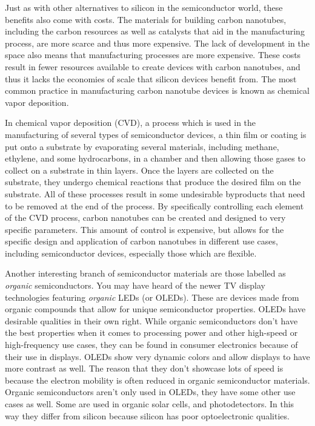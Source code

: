 \documentclass[12pt]{article}
\begin{document}
\begin{flushleft}
Just as with other alternatives to silicon in the semiconductor
world, these benefits also come with costs. The materials
for building carbon nanotubes, including the carbon
resources as well as catalysts that aid in the manufacturing
process, are more scarce and thus more expensive. The
lack of development in the space also means that manufacturing
processes are more expensive. These costs result in
fewer resources available to create devices with carbon
nanotubes, and thus it lacks the economies of scale
that silicon devices benefit from. The most common
practice in manufacturing carbon nanotube devices is
known as chemical vapor deposition.

In chemical vapor deposition (CVD), a process which
is used in the manufacturing of several types of semiconductor
devices, a thin film or coating is put onto a substrate
by evaporating several materials, including methane,
ethylene, and some hydrocarbons, in a chamber and then
allowing those gases to collect on a substrate in thin
layers. Once the layers are collected on the substrate,
they undergo chemical reactions that produce the desired
film on the substrate. All of these processes result
in some undesirable byproducts that need to be removed
at the end of the process. By specifically controlling
each element of the CVD process, carbon nanotubes can
be created and designed to very specific parameters.
This amount of control is expensive, but allows for the
specific design and application of carbon nanotubes in 
different use cases, including semiconductor devices,
especially those which are flexible.

Another interesting branch of semiconductor materials
are those labelled as \emph{organic} semiconductors.
You may have heard of the newer TV display technologies
featuring \emph{organic} LEDs (or OLEDs). These are
devices made from organic compounds that allow for
unique semiconductor properties. OLEDs have desirable
qualities in their own right. While organic semiconductors
don't have the best properties when it comes to processing
power and other high-speed or high-frequency use cases,
they can be found in consumer electronics because of
their use in displays. OLEDs show very dynamic colors
and allow displays to have more contrast as well. The
reason that they don't showcase lots of speed is because
the electron mobility is often reduced in organic semiconductor
materials. Organic semiconductors aren't only used
in OLEDs, they have some other use cases as well. 
Some are used in organic solar cells, and photodetectors.
In this way they differ from silicon because silicon
has poor optoelectronic qualities.


\end{flushleft}
\end{document}
